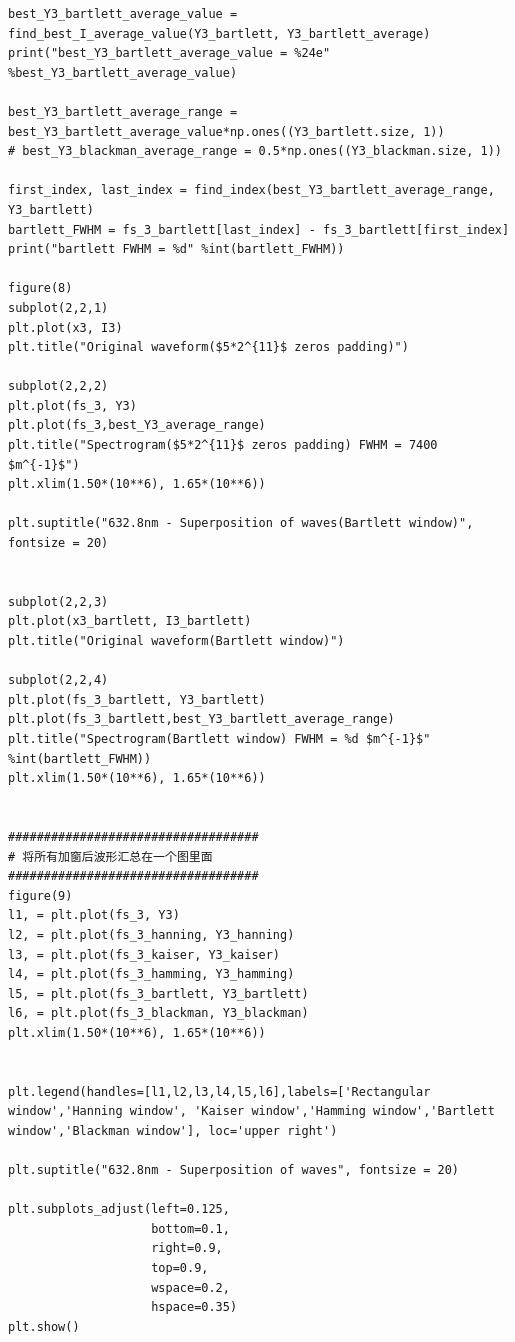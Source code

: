\documentclass[conference]{IEEEtran}
\begin{document}
\begin{lstlisting}
best_Y3_bartlett_average_value = find_best_I_average_value(Y3_bartlett, Y3_bartlett_average)
print("best_Y3_bartlett_average_value = %24e" %best_Y3_bartlett_average_value)

best_Y3_bartlett_average_range = best_Y3_bartlett_average_value*np.ones((Y3_bartlett.size, 1))
# best_Y3_blackman_average_range = 0.5*np.ones((Y3_blackman.size, 1))

first_index, last_index = find_index(best_Y3_bartlett_average_range, Y3_bartlett)
bartlett_FWHM = fs_3_bartlett[last_index] - fs_3_bartlett[first_index]
print("bartlett FWHM = %d" %int(bartlett_FWHM))

figure(8)
subplot(2,2,1)
plt.plot(x3, I3)
plt.title("Original waveform($5*2^{11}$ zeros padding)")

subplot(2,2,2)
plt.plot(fs_3, Y3)
plt.plot(fs_3,best_Y3_average_range)
plt.title("Spectrogram($5*2^{11}$ zeros padding) FWHM = 7400 $m^{-1}$")
plt.xlim(1.50*(10**6), 1.65*(10**6))

plt.suptitle("632.8nm - Superposition of waves(Bartlett window)", fontsize = 20)


subplot(2,2,3)
plt.plot(x3_bartlett, I3_bartlett)
plt.title("Original waveform(Bartlett window)")

subplot(2,2,4)
plt.plot(fs_3_bartlett, Y3_bartlett)
plt.plot(fs_3_bartlett,best_Y3_bartlett_average_range)
plt.title("Spectrogram(Bartlett window) FWHM = %d $m^{-1}$" %int(bartlett_FWHM))
plt.xlim(1.50*(10**6), 1.65*(10**6))


###################################
# 将所有加窗后波形汇总在一个图里面
###################################
figure(9)
l1, = plt.plot(fs_3, Y3)
l2, = plt.plot(fs_3_hanning, Y3_hanning)
l3, = plt.plot(fs_3_kaiser, Y3_kaiser)
l4, = plt.plot(fs_3_hamming, Y3_hamming)
l5, = plt.plot(fs_3_bartlett, Y3_bartlett)
l6, = plt.plot(fs_3_blackman, Y3_blackman)
plt.xlim(1.50*(10**6), 1.65*(10**6))


plt.legend(handles=[l1,l2,l3,l4,l5,l6],labels=['Rectangular window','Hanning window', 'Kaiser window','Hamming window','Bartlett window','Blackman window'], loc='upper right')

plt.suptitle("632.8nm - Superposition of waves", fontsize = 20)

plt.subplots_adjust(left=0.125,
                    bottom=0.1, 
                    right=0.9, 
                    top=0.9, 
                    wspace=0.2, 
                    hspace=0.35)
plt.show()
\end{lstlisting}
\end{document}
